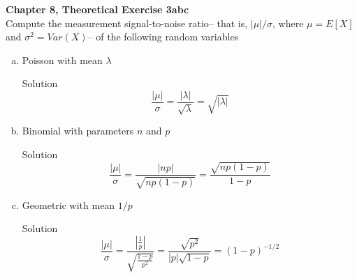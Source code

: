 \documentclass{article}
\begin{document}
\begin{spacing}{1.1}
\newpage
\begin{homeworkProblem}
  {\bf Chapter 8, Theoretical Exercise 3abc}\\
  Compute the measurement signal-to-noise ratio--
  that is, $|\mu|/\sigma$, where $\mu = E[ X]$ and $\sigma^2 = Var( X)$--
  of the following random variables
  \begin{enumerate}[(a)]
    \item Poisson with mean $\lambda$
      \begin{homeworkSection}{Solution}
        \[\frac{ |\mu|}{ \sigma} = \frac{ |\lambda|}{ \sqrt{\lambda}} = \sqrt{ |\lambda|}\]
      \end{homeworkSection}
    \item Binomial with parameters $n$ and $p$
      \begin{homeworkSection}{Solution}
        \[\frac{ |\mu|}{ \sigma} 
          = \frac{ |np|}{ \sqrt{ n p (1 - p)}} 
          = \frac{ \sqrt{ n p (1 - p)}}{ 1 - p}\]
      \end{homeworkSection}
    \item Geometric with mean $1/p$
      \begin{homeworkSection}{Solution}
        \[\frac{ |\mu|}{ \sigma} 
          = \frac{ \left|\frac{ 1}{ p}\right|}{ \sqrt{ \frac{ 1 - p}{ p^2}}} 
          = \frac{ \sqrt{ p^2}}{ |p| \sqrt{ 1 - p}} 
          = (1 - p)^{-1/2}\]
      
      \end{homeworkSection}
  \end{enumerate}
\end{homeworkProblem}


\end{spacing}
\end{document}
